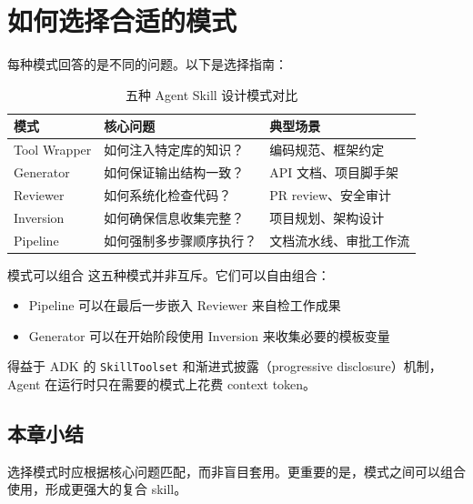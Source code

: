 \section{如何选择合适的模式}

每种模式回答的是不同的问题。以下是选择指南：

\begin{table}[H]
\centering
\begin{tabular}{@{}lll@{}}
\toprule
\textbf{模式} & \textbf{核心问题} & \textbf{典型场景} \\
\midrule
Tool Wrapper & 如何注入特定库的知识？ & 编码规范、框架约定 \\
Generator & 如何保证输出结构一致？ & API 文档、项目脚手架 \\
Reviewer & 如何系统化检查代码？ & PR review、安全审计 \\
Inversion & 如何确保信息收集完整？ & 项目规划、架构设计 \\
Pipeline & 如何强制多步骤顺序执行？ & 文档流水线、审批工作流 \\
\bottomrule
\end{tabular}
\caption{五种 Agent Skill 设计模式对比}
\end{table}

\begin{knowledgebox}{模式可以组合}
这五种模式并非互斥。它们可以自由组合：
\begin{itemize}
    \item Pipeline 可以在最后一步嵌入 Reviewer 来自检工作成果
    \item Generator 可以在开始阶段使用 Inversion 来收集必要的模板变量
\end{itemize}
得益于 ADK 的 \texttt{SkillToolset} 和渐进式披露（progressive disclosure）机制，Agent 在运行时只在需要的模式上花费 context token。
\end{knowledgebox}

\subsection{本章小结}

选择模式时应根据核心问题匹配，而非盲目套用。更重要的是，模式之间可以组合使用，形成更强大的复合 skill。

